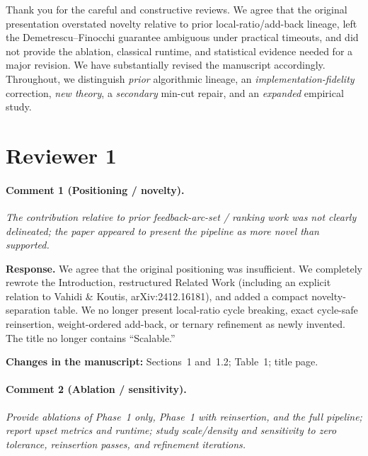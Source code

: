 \documentclass[11pt]{article}
\newcommand{\commentbox}[1]{\par\textit{#1}\par\medskip}
\newcommand{\changes}[1]{\textbf{Changes in the manuscript:} #1\par\medskip}
\begin{document}
Thank you for the careful and constructive reviews. We agree that the original presentation overstated novelty relative to prior local-ratio/add-back lineage, left the Demetrescu--Finocchi guarantee ambiguous under practical timeouts, and did not provide the ablation, classical runtime, and statistical evidence needed for a major revision. We have substantially revised the manuscript accordingly. Throughout, we distinguish \emph{prior} algorithmic lineage, an \emph{implementation-fidelity} correction, \emph{new theory}, a \emph{secondary} min-cut repair, and an \emph{expanded} empirical study.

\section*{Reviewer 1}

\paragraph{Comment 1 (Positioning / novelty).}
\commentbox{The contribution relative to prior feedback-arc-set / ranking work was not clearly delineated; the paper appeared to present the pipeline as more novel than supported.}

\noindent\textbf{Response.}
We agree that the original positioning was insufficient. We completely rewrote the Introduction, restructured Related Work (including an explicit relation to Vahidi \& Koutis, arXiv:2412.16181), and added a compact novelty-separation table. We no longer present local-ratio cycle breaking, exact cycle-safe reinsertion, weight-ordered add-back, or ternary refinement as newly invented. The title no longer contains ``Scalable.''

\changes{Sections~1 and~1.2; Table~1; title page.}

\paragraph{Comment 2 (Ablation / sensitivity).}
\commentbox{Provide ablations of Phase~1 only, Phase~1 with reinsertion, and the full pipeline; report upset metrics and runtime; study scale/density and sensitivity to zero tolerance, reinsertion passes, and refinement iterations.}
\end{document}
